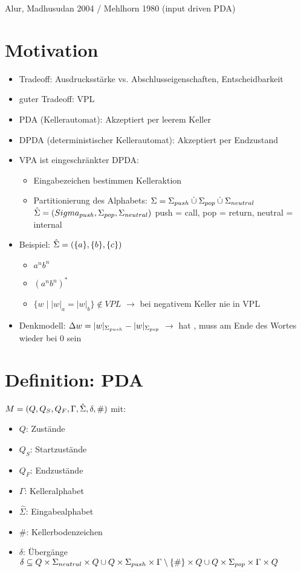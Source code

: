Alur, Madhusudan 2004 / Mehlhorn 1980 (input driven PDA)
\section{Motivation}
    \begin{itemize}
        \item Tradeoff: Ausdrucksstärke vs. Abschlusseigenschaften, Entscheidbarkeit
        \item guter Tradeoff: VPL
        \item PDA (Kellerautomat): Akzeptiert per leerem Keller
        \item DPDA (deterministischer Kellerautomat): Akzeptiert per Endzustand
        \item VPA ist eingeschränkter DPDA:
        \begin{itemize}
            \item Eingabezeichen bestimmen Kelleraktion
            \item Partitionierung des Alphabets:
            \subitem $\Sigma=\Sigma_{push}\mathbin{\dot{\cup}}\Sigma_{pop}\mathbin{\dot{\cup}}\Sigma_{neutral}$
            \subitem $\hat{\Sigma}=\left(Sigma_{push},\Sigma_{pop},\Sigma_{neutral}\right)$
            \subitem push = call, pop = return, neutral = internal
        \end{itemize}
        \item Beispiel: $\hat{\Sigma}=\left(\{a\},\{b\},\{c\}\right)$
        \begin{itemize}
            \item $a^nb^n$
            \item $(a^nb^n)^*$
            \item $\{w\mid|w|_a=|w|_b\}\not\in VPL$
            \subitem $\rightarrow$ bei negativem Keller nie in VPL
        \end{itemize}
        \item Denkmodell: $\Delta w=|w|_{\Sigma_{push}}-|w|_{\Sigma_{pop}}$
        \subitem $\rightarrow$ hat , muss am Ende des Wortes wieder bei 0 sein
    \end{itemize}
\section{Definition: PDA}
    $M=(Q,Q_S,Q_F,\Gamma,\hat{\Sigma},\delta,\#)$ mit:
    \begin{itemize}
        \item $Q$: Zustände
        \item $Q_S$: Startzustände
        \item $Q_F$: Endzustände
        \item $\Gamma$: Kelleralphabet
        \item $\hat\Sigma$: Eingabealphabet
        \item $\#$: Kellerbodenzeichen
        \item $\delta$: Übergänge
        \subitem $\delta \subseteq Q\times \Sigma_{neutral} \times Q \\\cup Q\times \Sigma_{push} \times \Gamma\setminus\{\#\}\times Q\\\cup Q\times \Sigma_{pop} \times\Gamma\times Q$
    \end{itemize}
